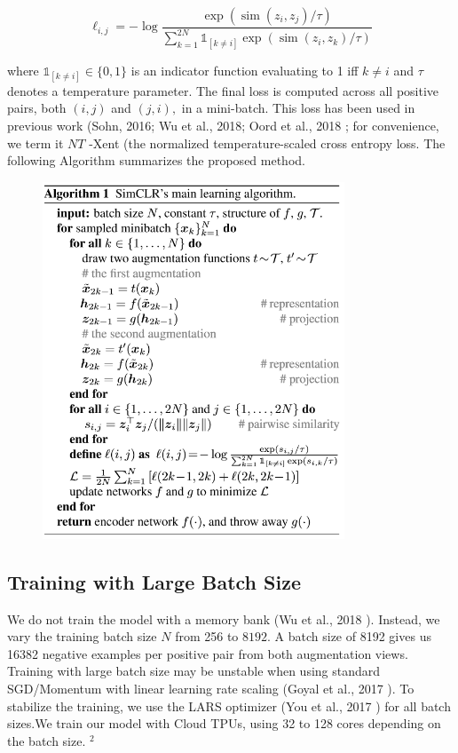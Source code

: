 \documentclass[]{IEEEtran}
\begin{document}
\begin{equation}
\ell_{i, j}=-\log \frac{\exp \left(\operatorname{sim}\left(z_{i}, z_{j}\right) / \tau\right)}{\sum_{k=1}^{2 N} \mathbb{1}_{[k \neq i]} \exp \left(\operatorname{sim}\left(z_{i}, z_{k}\right) / \tau\right)}
\label{eq01}
\end{equation}

where $\mathbb{1}_{[k \neq i]} \in\{0,1\}$ is an indicator function evaluating to 1 iff $k \neq i$ and $\tau$ denotes a temperature parameter. The final loss is computed across all positive pairs, both $(i, j)$ and $(j, i),$ in a mini-batch. This loss has been used in previous work (Sohn, 2016; Wu et al., 2018; Oord et al., 2018 ; for convenience, we term it $N T$ -Xent (the normalized temperature-scaled cross entropy loss.
The following Algorithm summarizes the proposed method.


\begin{figure}[h!]
    \centering
    \includegraphics[width=9cm]{./images/psdocode.PNG}
    \label{psdocode}
\end{figure}


\subsection{Training with Large Batch Size}

We do not train the model with a memory bank (Wu et al., 2018 ). Instead, we vary the training batch size $N$ from 256 to $8192 .$ A batch size of 8192 gives us 16382 negative examples per positive pair from both augmentation views. Training with large batch size may be unstable when using standard SGD/Momentum with linear learning rate scaling (Goyal et al., 2017 ). To stabilize the training, we use the LARS optimizer (You et al., 2017 ) for all batch sizes.We train our model with Cloud TPUs, using 32 to 128 cores depending on the batch size. $^{2}$
\end{document}
